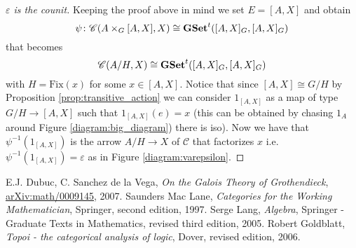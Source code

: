 \documentclass[italian, 12pt, reqno]{article}
\theoremstyle{myteo}
\numberwithin{equation}{section}
\newcommand{\cat}[1]{\mathscr{#1}}
\newcommand{\tgset}{\text{\textbf{GSet}}^t}
\newcommand{\homs}[2]{[#1, #2]}
\begin{document}
\begin{proof}[\(\varepsilon\) is the counit]
  Keeping the proof above in mind we set \(E = \homs{A}{X}\) and obtain
  \[\psi\colon \cat{C}(A\times_G\homs{A}{X}, X) \cong \tgset(\homs{A}{X}_G, \homs{A}{X}_G)\]
  that becomes
  \[\cat{C}(A/H, X) \cong \tgset(\homs{A}{X}_G, \homs{A}{X}_G)\]
  with \(H = \text{Fix}(x)\) for some \(x\in\homs{A}{X}\).
  Notice that since \(\homs{A}{X}\cong G/H\) by Proposition \ref{prop:transitive_action} we can consider \(1_{\homs{A}{X}}\) as a map of type \(G/H \to \homs{A}{X}\) such that \(1_{\homs{A}{X}}(e) = x\) (this can be obtained by chasing \(1_A\) around Figure \ref{diagram:big_diagram}) there is iso).
  Now we have that \(\psi^{-1}(1_{\homs{A}{X}})\) is the arrow \(A/H\to X\) of \(\cat{C}\) that factorizes \(x\) i.e. \(\psi^{-1}(1_{\homs{A}{X}}) = \varepsilon\) as in Figure \ref{diagram:varepsilon}.
\end{proof}

\begin{thebibliography}{1}
	E.J. Dubuc, C. Sanchez de la Vega,
  \textit{On the Galois Theory of Grothendieck},
  \href{https://arxiv.org/abs/math/0009145}{arXiv:math/0009145},
  2007.
  Saunders Mac Lane,
  \textit{Categories for the Working Mathematician},
  Springer,
  second edition,
  1997.
  Serge Lang,
  \textit{Algebra},
  Springer - Graduate Texts in Mathematics,
  revised third edition,
  2005.
  Robert Goldblatt,
  \textit{Topoi - the categorical analysis of logic},
  Dover,
  revised edition,
  2006.
\end{thebibliography}
\end{document}
